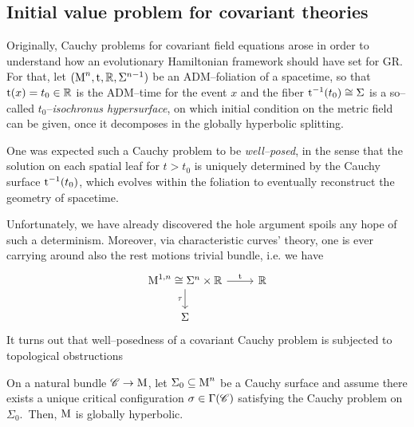 

\subsection{Initial value problem for covariant theories}\label{covariant_Cauchy}



Originally, Cauchy problems for covariant field equations arose in order to understand how an evolutionary Hamiltonian framework should have set for GR.\, For that, let $(\text{\normalfont M}^n,\text{\normalfont t},\mathbb{R},\Sigma^{n-1})$ be an ADM--foliation of a spacetime, so that $\text{\normalfont t}(x)=t_0\in\mathbb{R}$ is the ADM--time for the event $x$ %
and the fiber $\text{\normalfont t}^{-1}(t_0)\cong\Sigma$ is a so--called $t_0$--\emph{isochronus hypersurface}, on which initial condition on the metric field can be given, once it decomposes in the globally hyperbolic splitting.

One was expected such a Cauchy problem to be \emph{well--posed}, in the sense that the solution on each spatial leaf for $t>t_0$ is uniquely determined by the Cauchy surface $\text{\normalfont t}^{-1}(t_0)$, which evolves within the foliation to eventually reconstruct the geometry of spacetime.

Unfortunately, we have already discovered the hole argument spoils any hope of such a determinism. Moreover, via characteristic curves' theory, one is ever carrying around also the rest motions trivial bundle, i.e. we have
\[\begin{tikzcd}
\M^{1,n}\cong\Sigma^n\times\R\arrow{r}{\t} \arrow[swap]{d}{\tau} & \R \\
\Sigma
\end{tikzcd}
\]   
It turns out that well--posedness of a covariant Cauchy problem is subjected to topological obstructions

\begin{teo}[Geroch]\label{geroch_th}
    On a natural bundle $\mathscr{C}\to\text{\normalfont M}$, let $\Sigma_0\subseteq\text{\normalfont M}^n$ be a Cauchy surface and assume there exists a unique critical configuration $\sigma\in\Gamma(\mathscr{C})$ satisfying the Cauchy problem on $\Sigma_0$.\, Then, $\text{\normalfont M}$ is globally hyperbolic.%
\end{teo}

